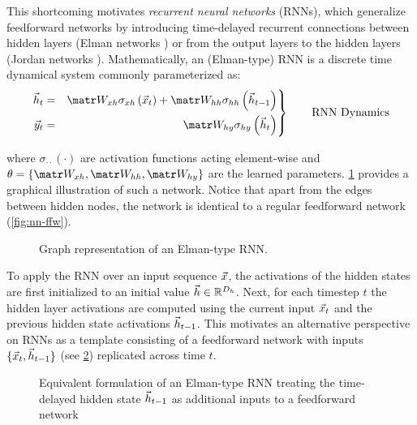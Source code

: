 This shortcoming motivates \emph{recurrent neural networks} (RNNs), which
generalize feedforward networks by introducing time-delayed recurrent
connections between hidden layers (Elman networks \citep{elman1990finding}) or
from the output layers to the hidden layers (Jordan networks
\citep{jordan1997serial}). Mathematically, an (Elman-type) RNN is a discrete time
dynamical system commonly parameterized as:
\begin{equation}\label{eq:rnn-dynamics}
 \left.\begin{aligned}
          \h_t &=& \W_{xh} \sigma_{xh} \left( \x_t \right) + \W_{hh} \sigma_{hh} \left( \h_{t-1} \right)\\
          \y_t &=& \W_{hy} \sigma_{hy} \left( \h_t \right)
       \end{aligned}
 \right\}
 \qquad \text{RNN Dynamics}
\end{equation}
\begin{align}
\end{align}
where $\sigma_{\cdot \cdot}(\cdot)$ are activation functions acting
element-wise and $\theta = \{ \W_{xh}, \W_{hh}, \W_{hy}\}$ are the learned
parameters. \cref{fig:nn-rnn} provides a graphical illustration of such a
network. Notice that apart from the edges between hidden nodes, the network is
identical to a regular feedforward network (\cref{fig:nn-ffw}).


\begin{figure}[htpb]
    \centering
    
    \caption{Graph representation of an Elman-type RNN.}
    \label{fig:nn-rnn}
\end{figure}

To apply the RNN over an input sequence $\vec{x}$, the activations of the hidden
states are first initialized to an initial value $\vec{h} \in \mathbb{R}^{D_{h}}$. Next,
for each timestep $t$ the hidden layer activations are computed using the
current input $\vec{x}_t$ and the previous hidden state activations $\vec{h}_{t-1}$.
This motivates an alternative perspective on RNNs as a template consisting
of a feedforward network with inputs $\{\vec{x}_t, \vec{h}_{t-1}\}$ (see
\cref{fig:rnn-elman}) replicated across time $t$.

\begin{figure}[htpb]
    \centering
    
    \caption{Equivalent formulation of an Elman-type RNN treating the time-delayed hidden state $\vec{h}_{t-1}$ as additional inputs to a feedforward network}
    \label{fig:rnn-elman}
\end{figure}


